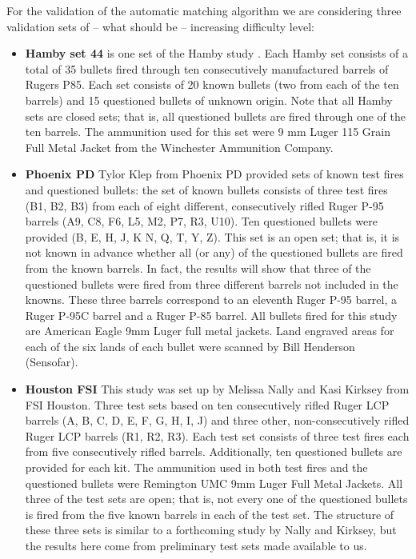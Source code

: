 \documentclass[doubleblind]{elsarticle}\usepackage[]{graphicx}\usepackage[]{color}
\begin{document}
For the validation of the automatic matching algorithm we are considering three validation sets of -- what should be -- increasing difficulty level: 
\begin{itemize}
\item {\bf Hamby set 44} is one set of the Hamby study \citep{hamby}. Each Hamby set  consists of a total of 35 bullets fired through ten consecutively manufactured barrels of Rugers P85. Each set consists of 20 known bullets (two from each of the ten barrels) and 15 questioned bullets of unknown origin. Note that all Hamby sets are closed sets; that is, all questioned bullets are fired through one of the ten barrels. The ammunition used for this set were 9 mm Luger 115 Grain Full Metal Jacket  from the Winchester Ammunition Company.
\item {\bf Phoenix PD}
Tylor Klep from Phoenix PD provided sets of known test fires and questioned bullets: the set of known bullets consists of three test fires (B1, B2, B3) from each of eight different, consecutively rifled Ruger P-95 barrels (A9, C8, F6, L5, M2, P7, R3, U10). Ten questioned bullets were provided (B, E, H, J, K N, Q, T, Y, Z). This set is an open set; that is, it is not known in advance whether all (or any) of the questioned bullets are fired from the known barrels. In fact, the results will show that three of the questioned bullets were fired from three different barrels not included in the knowns. These three barrels correspond to an eleventh Ruger P-95 barrel, a Ruger P-95C barrel and a Ruger P-85 barrel. All bullets fired for this study are American Eagle 9mm  Luger full metal jackets.
Land engraved areas for each of the six lands of each bullet were scanned by Bill Henderson (Sensofar).
\item {\bf Houston FSI}
This study was set up by Melissa Nally and Kasi Kirksey from FSI Houston. Three test sets based on ten consecutively rifled Ruger LCP barrels (A, B, C, D, E, F, G, H, I, J) and three other, non-consecutively rifled Ruger LCP barrels (R1, R2, R3). Each test set consists of three test fires each from five consecutively rifled barrels. Additionally, ten questioned bullets are provided for each kit. The ammunition used in both test fires and the questioned bullets were Remington UMC 9mm Luger Full Metal Jackets. All three of the test sets are open; that is, not every one of the questioned bullets is fired from the five known barrels in each of the test set.
The structure of these three sets is similar to a forthcoming study by Nally and Kirksey, but the results here come from preliminary test sets made available to us.
\end{itemize}
 
\end{document}
